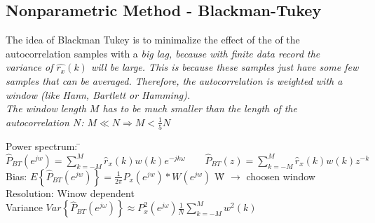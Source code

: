 \subsection{Nonparametric Method - Blackman-Tukey }
The idea of Blackman Tukey is to minimalize the effect of the of the autocorrelation samples with a \em big lag\em, because with finite data record the variance of $\hat{r_x}(k)$ will be large.
This is because these samples just have some few samples that can be averaged.
Therefore, the autocorrelation is weighted with a window (like Hann, Bartlett or Hamming).\\
The window length $M$ has to be much smaller than the length of the autocorrelation $N$: $M  \ll N \Rightarrow M < \frac{1}{5}N$
\begin{tabbing}
Power spectrum:  	\=  $\hat{P}_{BT}(e^{jw}) =  \sum\limits_{k=-M}^{M} \hat{r}_x(k)w(k)e^{-jk\omega} \qquad
						\hat{P}_{BT}(z) =  \sum\limits_{k=-M}^{M} \hat{r}_x(k)w(k)z^{-k}$   \\
Bias: 				\>  $E\left\lbrace \hat{P}_{BT}(e^{jw}) \right\rbrace = \frac{1}{2 \pi}P_x(e^{jw})*W(e^{jw})$  \hspace{2cm} \= W $\to$ choosen window\\
Resolution: 		\>  Winow dependent\\
Variance 			\> $Var\left\lbrace\hat{P}_{BT}(e^{j\omega})\right\rbrace \approx P^2_x(e^{j\omega}) \frac{1}{N} \sum\limits_{k=-M}^{M}w^2(k)$\\
\end{tabbing}

